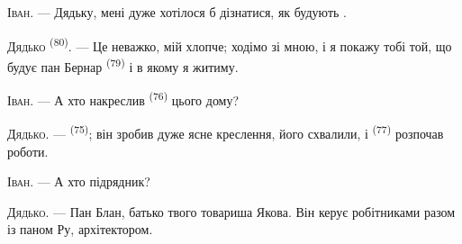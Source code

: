%
%
%
%

\VUsaut{6.0mm}
\VUsaut{1.4mm}
\VUsaut{2.2mm}

\VUsaut{3.0mm}

\textsc{Іван}. --- Дядьку, мені дуже хотілося б дізнатися, як будують
.

\textsc{Дядько} \textsuperscript{(80)}. --- Це неважко, мій хлопче; ходімо зі
мною, і я покажу тобі той, що будує пан Бернар \textsuperscript{(79)} і в якому я
житиму.

\textsc{Іван}. --- А хто накреслив  \textsuperscript{(76)} цього
дому?

\textsc{Дядько}. ---  \textsuperscript{(75)}; він зробив дуже
ясне креслення, його схвалили, і  \textsuperscript{(77)}
розпочав роботи.

\textsc{Іван}. --- А хто підрядник?

\textsc{Дядько}. --- Пан Блан, батько твого товариша Якова. Він керує
робітниками разом із паном Ру, архітектором.

